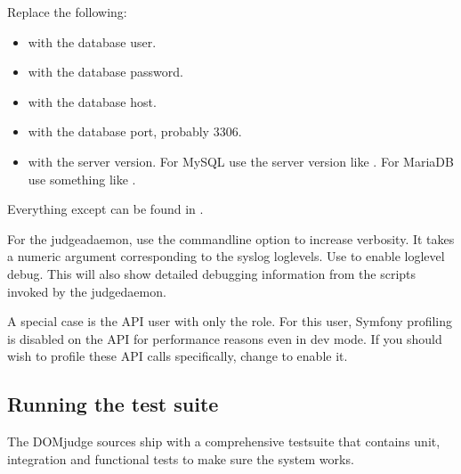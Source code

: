 \documentclass[a4paper,10pt,english,openany]{sphinxmanual}
\begin{document}
\sphinxAtStartPar
Replace the following:
\begin{itemize}
\item {} 
\sphinxAtStartPar
{} with the database user.

\item {} 
\sphinxAtStartPar
{} with the database password.

\item {} 
\sphinxAtStartPar
{} with the database host.

\item {} 
\sphinxAtStartPar
{} with the database port, probably 3306.

\item {} 
\sphinxAtStartPar
{} with the server version. For MySQL use the server version
like . For MariaDB use something like .

\end{itemize}

\sphinxAtStartPar
Everything except  can be found in .

\sphinxAtStartPar
For the judgeadaemon, use the  commandline option to increase
verbosity. It takes a numeric argument corresponding to the syslog
loglevels. Use  to enable loglevel debug. This will also show
detailed debugging information from the scripts invoked by the
judgedaemon.

\sphinxAtStartPar
A special case is the API user with only the  role. For
this user, Symfony profiling is disabled on the API for performance
reasons even in dev mode. If you should wish to profile these API calls
specifically, change 
to enable it.


\subsection{Running the test suite}
\label{\detokenize{develop:running-the-test-suite}}
\sphinxAtStartPar
The DOMjudge sources ship with a comprehensive test\sphinxhyphen{}suite that contains
unit, integration and functional tests to make sure the system works.
\end{document}
